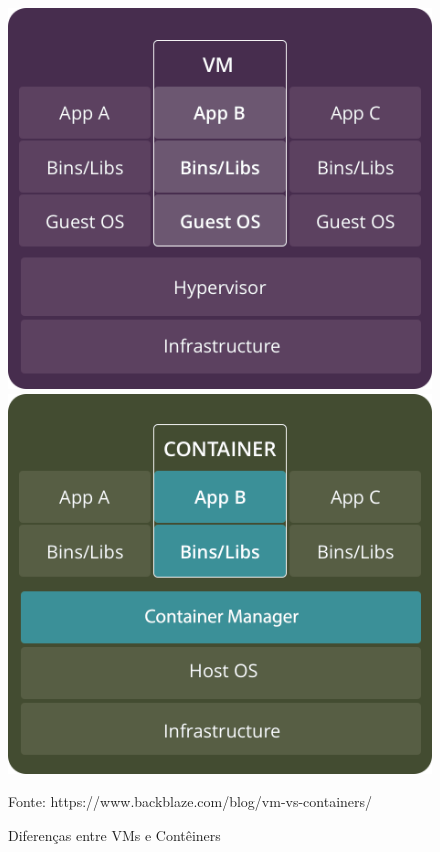 \documentclass[twosideprint]{politex}
\newcommand{\legend}[1]{\begin{center}\def\caption{}\caption{#1}\end{center}}
\begin{document}
	\begin{figure}[htb]
		\caption{\label{fig_circulo}Diferenças entre VMs e Contêiners}
		\begin{center}
    		\includegraphics[scale=0.20]{pictures/vms.png}
    		\includegraphics[scale=0.20]{pictures/containers.png}
		\end{center}
		\legend{Fonte: https://www.backblaze.com/blog/vm-vs-containers/}
	\end{figure}
	
\end{document}
